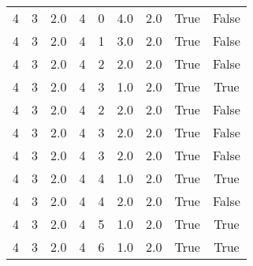 \documentclass[a4paper,12pt]{article}
\begin{document}
\begin{center}
\begin{tabular}{ c c c | c c c | c | c | c}
        4 & 3 & 2.0 & 4 & 0 & 4.0 & 2.0 & True & False    \\
        4 & 3 & 2.0 & 4 & 1 & 3.0 & 2.0 & True & False    \\
        4 & 3 & 2.0 & 4 & 2 & 2.0 & 2.0 & True & False    \\
        4 & 3 & 2.0 & 4 & 3 & 1.0 & 2.0 & True & True     \\
        4 & 3 & 2.0 & 4 & 2 & 2.0 & 2.0 & True & False    \\
        4 & 3 & 2.0 & 4 & 3 & 2.0 & 2.0 & True & False    \\
        4 & 3 & 2.0 & 4 & 3 & 2.0 & 2.0 & True & False    \\
        4 & 3 & 2.0 & 4 & 4 & 1.0 & 2.0 & True & True     \\
        4 & 3 & 2.0 & 4 & 4 & 2.0 & 2.0 & True & False    \\
        4 & 3 & 2.0 & 4 & 5 & 1.0 & 2.0 & True & True     \\
        4 & 3 & 2.0 & 4 & 6 & 1.0 & 2.0 & True & True     \\
    \end{tabular}
\end{center}
\end{document}
